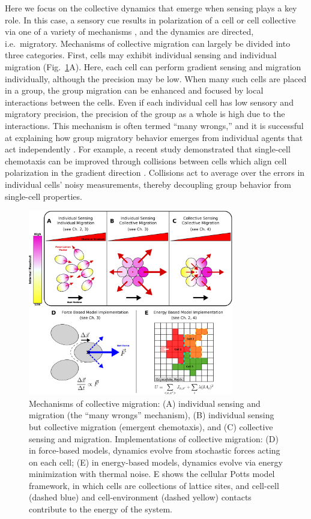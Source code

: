 Here we focus on the collective dynamics that emerge when sensing plays a key role. In this case, a sensory cue results in polarization of a cell or cell collective via one of a variety of mechanisms \cite{jilkine2011comparison}, and the dynamics are directed, i.e.\ migratory.
Mechanisms of collective migration can largely be divided into three categories. First, cells may exhibit individual sensing and individual migration (Fig.\ \ref{fig:ch1_3}A). Here, each cell can perform gradient sensing and migration individually, although the precision may be low. When many such cells are placed in a group, the group migration can be enhanced and focused by local interactions between the cells. Even if each individual cell has low sensory and migratory precision, the precision of the group as a whole is high due to the interactions. This mechanism is often termed ``many wrongs,'' and it is successful at explaining how group migratory behavior emerges from individual agents that act independently \cite{simons2004many}.
For example, a recent study demonstrated that single-cell chemotaxis can be improved through collisions between cells which align cell polarization in the gradient direction \cite{coburn2013tactile}. Collisions act to average over the errors in individual cells' noisy measurements, thereby decoupling group behavior from single-cell properties.


\begin{figure}[ht]
    \centering
        \includegraphics[width=0.8\textwidth]{../fig/ch1_fig3.pdf}
    \caption{Mechanisms of collective migration: (A) individual sensing and migration (the ``many wrongs'' mechanism), (B) individual sensing but collective migration (emergent chemotaxis), and (C) collective sensing and migration. Implementations of collective migration: (D) in force-based models, dynamics evolve from stochastic forces acting on each cell; (E) in energy-based models, dynamics evolve via energy minimization with thermal noise. E shows the cellular Potts model framework, in which cells are collections of lattice sites, and cell-cell (dashed blue) and cell-environment (dashed yellow) contacts contribute to the energy of the system.}
\label{fig:ch1_3}
\end{figure}


